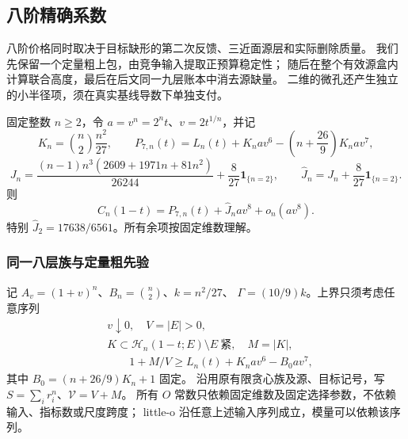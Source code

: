 \subsection{八阶精确系数}
\label{eighth:section}

八阶价格同时取决于目标缺形的第二次反馈、三近面源层和实际删除质量。
我们先保留一个定量粗上包，由竞争输入提取正预算稳定性；
随后在整个有效源盒内计算联合高度，最后在后文同一九层账本中消去源缺量。
二维的微孔还产生独立的小半径项，须在真实基线导数下单独支付。

\begin{theorem}[八阶精确展开]\label{eighth:theorem}
固定整数 \(n\ge2\)，令 \(a=v^n=2^nt\)、\(v=2t^{1/n}\)，并记
\[
 K_n=\binom n2\frac{n^2}{27},\qquad
 P_{7,n}(t)=L_n(t)+K_nav^6-\left(n+\frac{26}{9}\right)K_nav^7,
\]
\[
 J_n=\frac{(n-1)n^3(2609+1971n+81n^2)}{26244}
       +\frac8{27}\mathbf1_{\{n=2\}},\qquad
 \widehat J_n=J_n+\frac8{27}\mathbf1_{\{n=2\}}.
\]
则
\begin{equation}\label{eighth:exact-expansion}
 C_n(1-t)=P_{7,n}(t)+\widehat J_nav^8+o_n(av^8).
\end{equation}
特别 \(\widehat J_2=17638/6561\)。所有余项按固定维数理解。
\end{theorem}

\subsubsection{同一八层族与定量粗先验}

记 \(A_v=(1+v)^n\)、\(B_n=\binom n2\)、\(k=n^2/27\)、
\(\Gamma=(10/9)k\)。上界只须考虑任意序列
\begin{equation}\label{eighth:critical}
 \begin{aligned}
 &v\downarrow0,\quad V=|E|>0,\quad\\
 &K\subset\mathcal H_n(1-t;E)\setminus E\ \text{紧},\quad M=|K|,\\
 &\qquad 1+M/V\ge L_n(t)+K_nav^6-B_0av^7,
 \end{aligned}
\end{equation}
其中 \(B_0=(n+26/9)K_n+1\) 固定。
沿用原有限贪心族及源、目标记号，写 \(S=\sum_i r_i^n\)、\(\mathcal V=V+M\)。
所有 \(O\) 常数只依赖固定维数及固定选择参数，不依赖输入、指标数或尺度跨度；
little-o 沿任意上述输入序列成立，模量可以依赖该序列。

